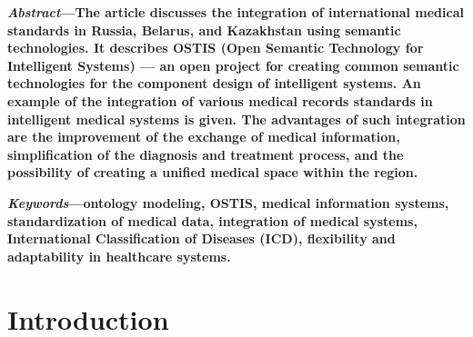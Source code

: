 \documentclass[10pt, a4paper]{article}
\begin{document}
\begin{multicols}{2}
\par \textbf{\textit{Abstract}—The article discusses the integration of international medical standards in Russia, Belarus, and Kazakhstan using semantic technologies. It describes OSTIS
(Open Semantic Technology for Intelligent Systems) — an
open project for creating common semantic technologies for
the component design of intelligent systems. An example
of the integration of various medical records standards in
intelligent medical systems is given. The advantages of such
integration are the improvement of the exchange of medical
information, simplification of the diagnosis and treatment
process, and the possibility of creating a unified medical
space within the region.}
\par \textbf{\textit{Keywords}—ontology modeling, OSTIS, medical information systems, standardization of medical data, integration
of medical systems, International Classification of Diseases
(ICD), flexibility and adaptability in healthcare systems.}

    
\section{Introduction}


\end{multicols}
\end{document}
